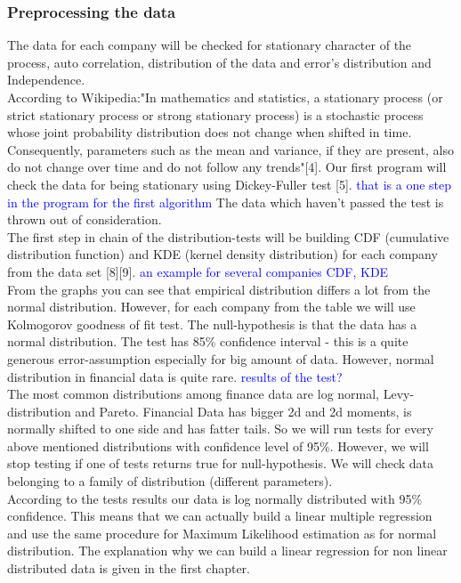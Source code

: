 \documentclass[12pt, a4paper]{article}
\begin{document}
\subsubsection{Preprocessing the data}
The data for each company will be checked for stationary character of the process, auto correlation, distribution of the data and error's distribution and Independence.\\
According to Wikipedia:"In mathematics and statistics, a stationary process (or strict stationary process or strong stationary process) is a stochastic process whose joint probability distribution does not change when shifted in time. Consequently, parameters such as the mean and variance, if they are present, also do not change over time and do not follow any trends"[4]. Our first program will check the data for being stationary using Dickey-Fuller test [5]. \textcolor{blue}{that is a one step in the program for the first algorithm} The data which haven't passed the test is thrown out of consideration.\\
The first step in chain of the distribution-tests will be building CDF (cumulative distribution function) and KDE (kernel density distribution) for each company from the data set [8][9]. \textcolor{blue}{an example for several companies CDF, KDE}\\
From the graphs you can see that empirical distribution differs a lot from the normal distribution. However, for each company from the table we will use Kolmogorov goodness of fit test. The null-hypothesis is that the data has a normal distribution. The test has 85\% confidence interval - this is a quite generous error-assumption especially for big amount of data. However, normal distribution in financial data is quite rare. \textcolor{blue}{results of the test?}\\
The most common distributions among finance data are log normal, Levy-distribution and Pareto. Financial Data has bigger 2d and 2d moments, is normally shifted to one side and has fatter tails. So we will run tests for every above mentioned distributions with confidence level of 95\%. However, we will stop testing if one of tests returns true for null-hypothesis. We will check data belonging to a family of distribution (different parameters).\\
According to the tests results our data is log normally distributed with 95\% confidence. This means that we can actually build a linear multiple regression and use the same procedure for Maximum Likelihood estimation as for normal distribution. The explanation why we can build a linear regression for non linear distributed data is given in the first chapter. 
\end{document}
